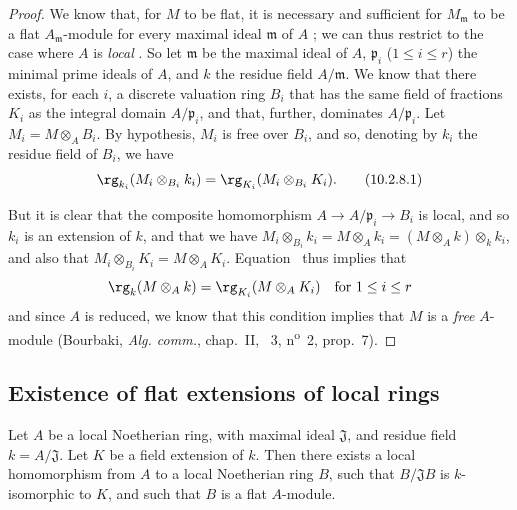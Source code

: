 \begin{proof}
We know that, for $M$ to be flat, it is necessary and sufficient for $M_\mathfrak{m}$ to be a flat $A_\mathfrak{m}$-module for every maximal ideal $\mathfrak{m}$ of $A$ ;
we can thus restrict to the case where $A$ is \emph{local} .
So let $\mathfrak{m}$ be the maximal ideal of $A$, $\mathfrak{p}_i$ ($1\leq i\leq r$) the minimal prime ideals of $A$, and $k$ the residue field $A/\mathfrak{m}$.
We know  that there exists, for each $i$, a discrete valuation ring $B_i$ that has the same field of fractions $K_i$ as the integral domain $A/\mathfrak{p}_i$, and that, further, dominates $A/\mathfrak{p}_i$.
Let $M_i=M\otimes_A B_i$.
By hypothesis, $M_i$ is free over $B_i$, and so, denoting by $k_i$ the residue field of $B_i$, we have
\[
\label{0.10.2.8.1}
  \rg_{k_i}(M_i\otimes_{B_i}k_i)=\rg_{K_i}(M_i\otimes_{B_i}K_i).
  \tag{10.2.8.1}
\]

But it is clear that the composite homomorphism $A\to A/\mathfrak{p}_i\to B_i$ is local, and so $k_i$ is an extension of $k$, and that we have $M_i\otimes_{B_i}k_i = M\otimes_A k_i = (M\otimes_A k)\otimes_k k_i$, and also that $M_i\otimes_{B_i}K_i = M\otimes_A K_i$.
Equation~ thus implies that
\[
  \rg_k(M\otimes_A k)=\rg_{K_i}(M\otimes_A K_i)\quad\mbox{for $1\leq i\leq r$}
\]
and since $A$ is reduced, we know that this condition implies that $M$ is a \emph{free} $A$-module (Bourbaki, \emph{Alg. comm.}, chap.~II, \textsection~3, n\textsuperscript{o}~2, prop.~7).
\end{proof}

\subsection{Existence of flat extensions of local rings}
\label{subsection:0.10.3}

\begin{proposition}[10.3.1]
\label{0.10.3.1}
Let $A$ be a local Noetherian ring, with maximal ideal $\mathfrak{J}$, and residue field $k=A/\mathfrak{J}$.
Let $K$ be a field extension of $k$.
Then there exists a local homomorphism from $A$ to a local Noetherian ring $B$, such that $B/\mathfrak{J}B$ is $k$-isomorphic to $K$, and such that $B$ is a flat $A$-module.
\end{proposition}

